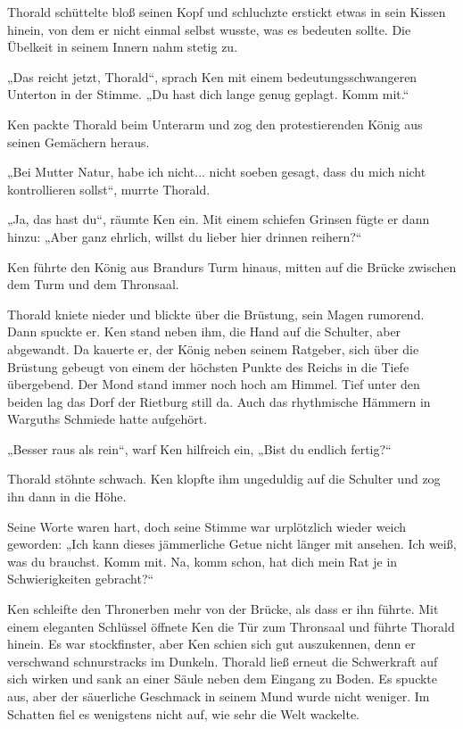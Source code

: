 \documentclass[10pt, a4paper, oneside]{book}
\begin{document}
Thorald schüttelte bloß seinen Kopf und schluchzte erstickt etwas in sein Kissen hinein, von dem er nicht einmal selbst wusste, was es bedeuten sollte. Die Übelkeit in seinem Innern nahm stetig zu.

„Das reicht jetzt, Thorald“, sprach Ken mit einem bedeutungsschwangeren Unterton in der Stimme. „Du hast dich lange genug geplagt. Komm mit.“

Ken packte Thorald beim Unterarm und zog den protestierenden König aus seinen Gemächern heraus.

„Bei Mutter Natur, habe ich nicht... nicht soeben gesagt, dass du mich nicht kontrollieren sollst“, murrte Thorald.

„Ja, das hast du“, räumte Ken ein. Mit einem schiefen Grinsen fügte er dann hinzu: „Aber ganz ehrlich, willst du lieber hier drinnen reihern?“\bigskip







Ken führte den König aus Brandurs Turm hinaus, mitten auf die Brücke zwischen dem Turm und dem Thronsaal.

Thorald kniete nieder und blickte über die Brüstung, sein Magen rumorend. Dann spuckte er. Ken stand neben ihm, die Hand auf die Schulter, aber abgewandt. Da kauerte er, der König neben seinem Ratgeber, sich über die Brüstung gebeugt von einem der höchsten Punkte des Reichs in die Tiefe übergebend. Der Mond stand immer noch hoch am Himmel. Tief unter den beiden lag das Dorf der Rietburg still da. Auch das rhythmische Hämmern in Warguths Schmiede hatte aufgehört.

„Besser raus als rein“, warf Ken hilfreich ein, „Bist du endlich fertig?“

Thorald stöhnte schwach. Ken klopfte ihm ungeduldig auf die Schulter und zog ihn dann in die Höhe.

Seine Worte waren hart, doch seine Stimme war urplötzlich wieder weich geworden: „Ich kann dieses jämmerliche Getue nicht länger mit ansehen. Ich weiß, was du brauchst. Komm mit. Na, komm schon, hat dich mein Rat je in Schwierigkeiten gebracht?“

Ken schleifte den Thronerben mehr von der Brücke, als dass er ihn führte. Mit einem eleganten Schlüssel öffnete Ken die Tür zum Thronsaal und führte Thorald hinein. Es war stockfinster, aber Ken schien sich gut auszukennen, denn er verschwand schnurstracks im Dunkeln. Thorald ließ erneut die Schwerkraft auf sich wirken und sank an einer Säule neben dem Eingang zu Boden. Es spuckte aus, aber der säuerliche Geschmack in seinem Mund wurde nicht weniger. Im Schatten fiel es wenigstens nicht auf, wie sehr die Welt wackelte.
\end{document}
